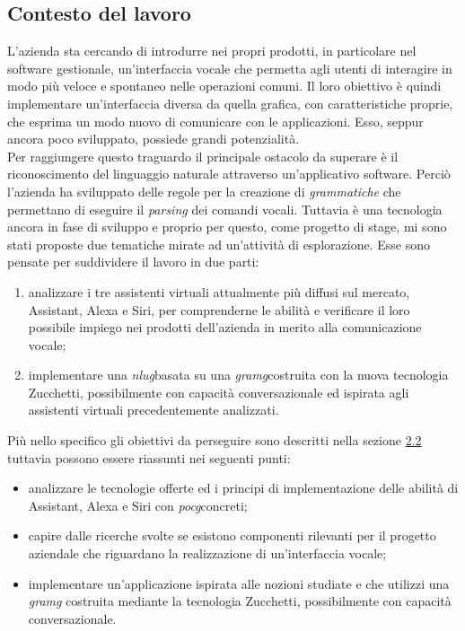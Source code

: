 \subsection{Contesto del lavoro}
L'azienda sta cercando di introdurre nei propri prodotti, in particolare nel software gestionale, un'interfaccia vocale che permetta agli utenti di interagire in modo più veloce e spontaneo nelle operazioni comuni. Il loro obiettivo è quindi implementare un'interfaccia diversa da quella grafica, con caratteristiche proprie, che esprima un modo nuovo di comunicare con le applicazioni. Esso, seppur ancora poco sviluppato, possiede grandi potenzialità. \\
Per raggiungere questo traguardo il principale ostacolo da superare è il riconoscimento del linguaggio naturale attraverso un'applicativo software. Perciò l'azienda ha sviluppato delle regole per la creazione di \emph{grammatiche} che permettano di eseguire il \emph{parsing} dei comandi vocali. Tuttavia è una tecnologia ancora in fase di sviluppo e proprio per questo, come progetto di stage, mi sono stati proposte due tematiche mirate ad un'attività di esplorazione. Esse sono pensate per suddividere il lavoro in due parti:
\begin{enumerate}
	\item analizzare i tre assistenti virtuali attualmente più diffusi sul mercato, Assistant, Alexa e Siri, per comprenderne le abilità e verificare il loro possibile impiego nei prodotti dell'azienda in merito alla comunicazione vocale;
	\item implementare una \emph{\gls{nlug}}\glsfirstoccur basata su una \emph{\gls{gramg}}\glsfirstoccur costruita con la nuova tecnologia Zucchetti, possibilmente con capacità conversazionale ed ispirata agli assistenti virtuali precedentemente analizzati.
\end{enumerate}
Più nello specifico gli obiettivi da perseguire sono descritti nella sezione \hyperref[section:obiettivi]{2.2} tuttavia possono essere riassunti nei seguenti punti:
\begin{itemize}
	\item analizzare le tecnologie offerte ed i principi di implementazione delle abilità di Assistant, Alexa e Siri con \emph{\gls{pocg}}\glsfirstoccur concreti;
	\item capire dalle ricerche svolte se esistono componenti rilevanti per il progetto aziendale che riguardano la realizzazione di un'interfaccia vocale;
	\item implementare un'applicazione ispirata alle nozioni studiate e che utilizzi una \emph{\gls{gramg}} costruita mediante la tecnologia Zucchetti, possibilmente con capacità conversazionale.
\end{itemize}
